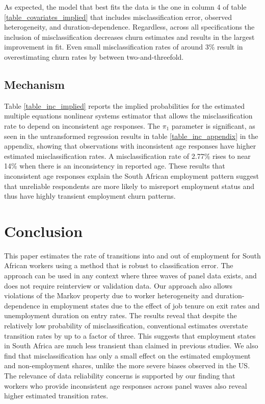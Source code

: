\documentclass[letterpaper,12pt,final,dvipsnames]{article}
\begin{document}
As expected, the model that best fits the data is the one in column 4 of table \ref{table_covariates_implied} that includes misclassification error, observed heterogeneity, and duration-dependence. Regardless, across all specifications the inclusion of misclassification decreases churn estimates and results in the largest improvement in fit. Even small misclassification rates of around 3\% result in overestimating churn rates by between two-and-threefold. 



\subsection{Mechanism} \label{sec_mechanism}

Table \ref{table_inc_implied} reports the implied probabilities for the estimated multiple equations nonlinear systems estimator that allows the misclassification rate to depend on inconsistent age responses. The $\pi_1$ parameter is significant, as seen in the untransformed regression results in table \ref{table_inc_appendix} in the appendix, showing that observations with inconsistent age responses have higher estimated misclassification rates. A misclassification rate of 2.77\% rises to near 14\% when there is an inconsistency in reported age. These results \textemdash that inconsistent age responses explain the South African employment pattern \textemdash suggest that unreliable respondents are more likely to misreport employment status and thus have highly transient employment churn patterns. 







\section{Conclusion} \label{sec_conclusion}

This paper estimates the rate of transitions into and out of employment for South African workers using a method that is robust to classification error. The approach can be used in any context where three waves of panel data exists, and does not require reinterview or validation data. Our approach also allows violations of the Markov property due to worker heterogeneity and duration-dependence in employment states due to the effect of job tenure on exit rates and unemployment duration on entry rates. The results reveal that despite the relatively low probability of misclassification, conventional estimates overstate transition rates by up to a factor of three. This suggests that employment states in South Africa are much less transient than claimed in previous studies. We also find that misclassification has only a small effect on the estimated employment and non-employment shares, unlike the more severe biases observed in the US. The relevance of data reliability concerns is supported by our finding that workers who provide inconsistent age responses across panel waves also reveal higher estimated transition rates. 
\end{document}
